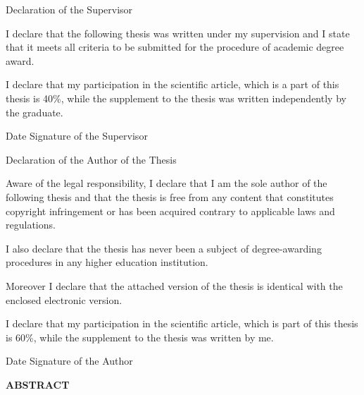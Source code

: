 \documentclass[11pt]{article} %
\begin{document}
\pagebreak

\noindent Declaration of the Supervisor

\noindent I declare that the following thesis was written under my supervision and I state that it meets all criteria to be submitted for the procedure of academic degree award.

\noindent I declare that my participation in the scientific article, which is a part of this thesis is 40\%, while the supplement to the thesis was written independently by the graduate.

\vspace{\baselineskip}
\vspace{\baselineskip}
\vspace{\baselineskip}

Date \hfill Signature of the Supervisor

\vspace{\baselineskip}
\vspace{\baselineskip}
\vspace{\baselineskip}

\noindent Declaration of the Author of the Thesis

\noindent Aware of the legal responsibility, I declare that I am the sole author of the following thesis and that the thesis is free from any content that constitutes copyright infringement or has been acquired contrary to applicable laws and regulations.

\noindent I also declare that the thesis has never been a subject of degree-awarding procedures in any higher education institution.

\noindent Moreover I declare that the attached version of the thesis is identical with the enclosed electronic version.

\noindent I declare that my participation in the scientific article, which is part of this thesis is 60\%, while the supplement to the thesis was written by me.

\vspace{\baselineskip}
\vspace{\baselineskip}
\vspace{\baselineskip}

Date \hfill Signature of the Author

\pagebreak

\begin{center}
\textbf{ABSTRACT}
\end{center}
\end{document}
